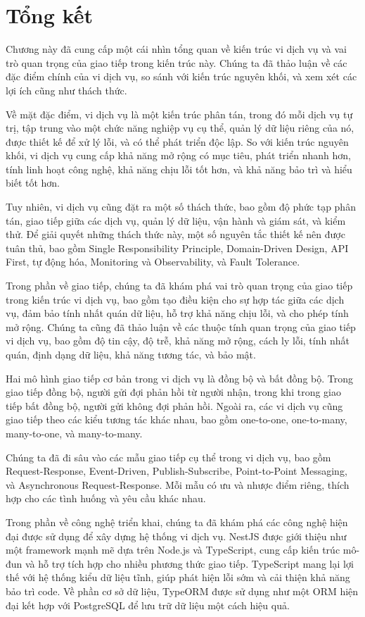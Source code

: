 \section{Tổng kết}

Chương này đã cung cấp một cái nhìn tổng quan về kiến trúc vi dịch vụ và vai trò quan trọng của giao tiếp trong kiến trúc này. Chúng ta đã thảo luận về các đặc điểm chính của vi dịch vụ, so sánh với kiến trúc nguyên khối, và xem xét các lợi ích cũng như thách thức.

Về mặt đặc điểm, vi dịch vụ là một kiến trúc phân tán, trong đó mỗi dịch vụ tự trị, tập trung vào một chức năng nghiệp vụ cụ thể, quản lý dữ liệu riêng của nó, được thiết kế để xử lý lỗi, và có thể phát triển độc lập. So với kiến trúc nguyên khối, vi dịch vụ cung cấp khả năng mở rộng có mục tiêu, phát triển nhanh hơn, tính linh hoạt công nghệ, khả năng chịu lỗi tốt hơn, và khả năng bảo trì và hiểu biết tốt hơn.

Tuy nhiên, vi dịch vụ cũng đặt ra một số thách thức, bao gồm độ phức tạp phân tán, giao tiếp giữa các dịch vụ, quản lý dữ liệu, vận hành và giám sát, và kiểm thử. Để giải quyết những thách thức này, một số nguyên tắc thiết kế nên được tuân thủ, bao gồm Single Responsibility Principle, Domain-Driven Design, API First, tự động hóa, Monitoring và Observability, và Fault Tolerance.

Trong phần về giao tiếp, chúng ta đã khám phá vai trò quan trọng của giao tiếp trong kiến trúc vi dịch vụ, bao gồm tạo điều kiện cho sự hợp tác giữa các dịch vụ, đảm bảo tính nhất quán dữ liệu, hỗ trợ khả năng chịu lỗi, và cho phép tính mở rộng. Chúng ta cũng đã thảo luận về các thuộc tính quan trọng của giao tiếp vi dịch vụ, bao gồm độ tin cậy, độ trễ, khả năng mở rộng, cách ly lỗi, tính nhất quán, định dạng dữ liệu, khả năng tương tác, và bảo mật.

Hai mô hình giao tiếp cơ bản trong vi dịch vụ là đồng bộ và bất đồng bộ. Trong giao tiếp đồng bộ, người gửi đợi phản hồi từ người nhận, trong khi trong giao tiếp bất đồng bộ, người gửi không đợi phản hồi. Ngoài ra, các vi dịch vụ cũng giao tiếp theo các kiểu tương tác khác nhau, bao gồm one-to-one, one-to-many, many-to-one, và many-to-many.

Chúng ta đã đi sâu vào các mẫu giao tiếp cụ thể trong vi dịch vụ, bao gồm Request-Response, Event-Driven, Publish-Subscribe, Point-to-Point Messaging, và Asynchronous Request-Response. Mỗi mẫu có ưu và nhược điểm riêng, thích hợp cho các tình huống và yêu cầu khác nhau.

Trong phần về công nghệ triển khai, chúng ta đã khám phá các công nghệ hiện đại được sử dụng để xây dựng hệ thống vi dịch vụ. NestJS được giới thiệu như một framework mạnh mẽ dựa trên Node.js và TypeScript, cung cấp kiến trúc mô-đun và hỗ trợ tích hợp cho nhiều phương thức giao tiếp. TypeScript mang lại lợi thế với hệ thống kiểu dữ liệu tĩnh, giúp phát hiện lỗi sớm và cải thiện khả năng bảo trì code. Về phần cơ sở dữ liệu, TypeORM được sử dụng như một ORM hiện đại kết hợp với PostgreSQL để lưu trữ dữ liệu một cách hiệu quả.

